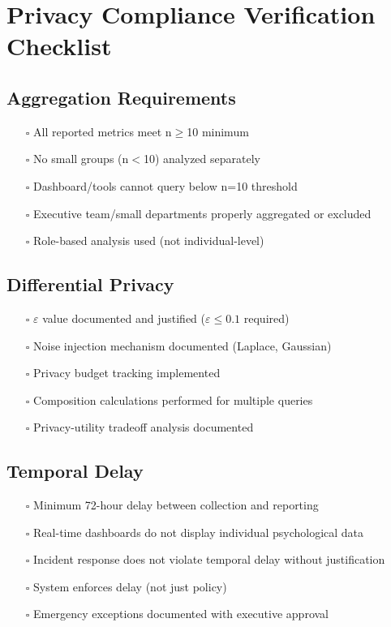 \documentclass[11pt,a4paper]{article}
\begin{document}
\section{Privacy Compliance Verification Checklist}

\subsection{Aggregation Requirements}

\begin{itemize}
\item[$\square$] All reported metrics meet n$\geq$10 minimum
\item[$\square$] No small groups (n$<$10) analyzed separately
\item[$\square$] Dashboard/tools cannot query below n=10 threshold
\item[$\square$] Executive team/small departments properly aggregated or excluded
\item[$\square$] Role-based analysis used (not individual-level)
\end{itemize}

\subsection{Differential Privacy}

\begin{itemize}
\item[$\square$] $\varepsilon$ value documented and justified ($\varepsilon \leq 0.1$ required)
\item[$\square$] Noise injection mechanism documented (Laplace, Gaussian)
\item[$\square$] Privacy budget tracking implemented
\item[$\square$] Composition calculations performed for multiple queries
\item[$\square$] Privacy-utility tradeoff analysis documented
\end{itemize}

\subsection{Temporal Delay}

\begin{itemize}
\item[$\square$] Minimum 72-hour delay between collection and reporting
\item[$\square$] Real-time dashboards do not display individual psychological data
\item[$\square$] Incident response does not violate temporal delay without justification
\item[$\square$] System enforces delay (not just policy)
\item[$\square$] Emergency exceptions documented with executive approval
\end{itemize}
\end{document}
